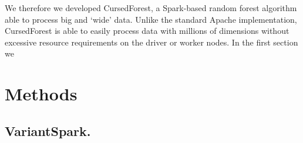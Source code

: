 \documentclass[10pt,letterpaper]{article}
\begin{document}

We therefore we developed CursedForest, a Spark-based random forest algorithm able to process big and `wide' data. Unlike
the standard Apache implementation, CursedForest is able to easily process data with millions of dimensions without
excessive resource requirements on the driver or worker nodes.
In the first section we 


\section*{Methods}




\subsection*{VariantSpark.}



\end{document}
